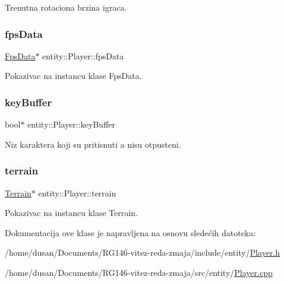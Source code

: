 Trenutna rotaciona brzina igraca. 

\mbox{\label{classentity_1_1Player_a830db86853301f3619dd4416c52229e4}} 
\subsubsection{\texorpdfstring{fps\+Data}{fpsData}}
{\footnotesize\ttfamily \hyperlink{classutility_1_1FpsData}{Fps\+Data}$\ast$ entity\+::\+Player\+::fps\+Data\hspace{0.3cm}{\ttfamily [private]}}



Pokazivac na instancu klase Fps\+Data. 

\mbox{\label{classentity_1_1Player_ad36623cb0c52ae4dc97d73cbf1cd2134}} 
\subsubsection{\texorpdfstring{key\+Buffer}{keyBuffer}}
{\footnotesize\ttfamily bool$\ast$ entity\+::\+Player\+::key\+Buffer\hspace{0.3cm}{\ttfamily [private]}}



Niz karaktera koji su pritisnuti a nisu otpusteni. 

\mbox{\label{classentity_1_1Player_adc298ca7a3d8ab3528440489ed4ea60e}} 
\subsubsection{\texorpdfstring{terrain}{terrain}}
{\footnotesize\ttfamily \hyperlink{classterrain_1_1Terrain}{Terrain}$\ast$ entity\+::\+Player\+::terrain\hspace{0.3cm}{\ttfamily [private]}}



Pokazivac na instancu klase Terrain. 



Dokumentacija ove klase je napravljena na osnovu sledećih datoteka\+:\begin{DoxyCompactItemize}
\item 
/home/dusan/\+Documents/\+R\+G146-\/vitez-\/reda-\/zmaja/include/entity/\hyperlink{Player_8h}{Player.\+h}\item 
/home/dusan/\+Documents/\+R\+G146-\/vitez-\/reda-\/zmaja/src/entity/\hyperlink{Player_8cpp}{Player.\+cpp}\end{DoxyCompactItemize}
